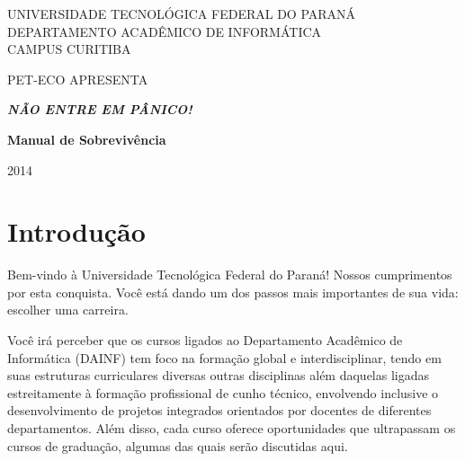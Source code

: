 \documentclass[a4paper,12pt,openany]{article}
\newcommand\BackgroundPic{
\put(0,0){
\parbox[b][\paperheight]{\paperwidth}{
\vfill
\centering
\vfill
}}}
\begin{document}
	\begin{titlepage}
	

        \begin{center}
            UNIVERSIDADE TECNOLÓGICA FEDERAL DO PARANÁ\\
            DEPARTAMENTO ACADÊMICO DE INFORMÁTICA\\
            CAMPUS CURITIBA

            \vspace{4cm}

            PET-ECO APRESENTA

            \vfill

	        { \Huge \emph { \textbf {NÃO ENTRE EM PÂNICO! }} }


            \vspace{4cm}

	        { \LARGE \textbf {Manual de Sobrevivência} }

            \vfill

            2014
        \end{center}

	\end{titlepage}

\thispagestyle{empty}
\tableofcontents

\newpage
\section{Introdução}

Bem-vindo à Universidade Tecnológica Federal do Paraná! Nossos cumprimentos por esta conquista. Você está dando um dos passos mais importantes de sua vida: escolher uma carreira.

Você irá perceber que os cursos ligados ao Departamento Acadêmico de Informática (DAINF) tem foco na formação global e interdisciplinar, tendo em suas estruturas curriculares diversas outras disciplinas além daquelas ligadas estreitamente à formação profissional de cunho técnico, envolvendo inclusive o desenvolvimento de projetos integrados orientados por docentes de diferentes departamentos. Além disso, cada curso oferece oportunidades que ultrapassam os cursos de graduação, algumas das quais serão discutidas aqui.
\end{document}
